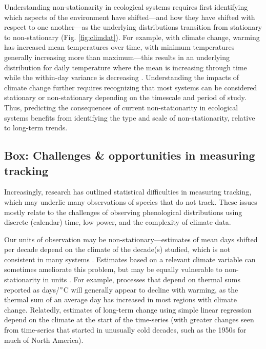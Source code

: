 \documentclass[11pt,letterpaper]{article}
\begin{document}
Understanding non-stationarity in ecological systems requires first identifying which aspects of the environment have shifted---and how they have shifted with respect to one another---as the underlying  distributions transition from stationary to non-stationary (Fig. \ref{fig:climdat}). For example, with climate change, warming has increased mean temperatures over time, with minimum temperatures generally increasing more than maximum---this results in an underlying distribution for daily temperature where the mean is increasing through time while the within-day variance is decreasing \citep{ipcc2013,screen2014}.  Understanding the impacts of climate change further requires recognizing that most systems can be considered stationary or non-stationary depending on the timescale and period of study. Thus, predicting the consequences of current non-stationarity in ecological systems benefits from identifying the type and scale of non-stationarity, relative to long-term trends.  



\subsection{Box: Challenges \& opportunities in measuring tracking} %
Increasingly, research has outlined statistical difficulties in measuring tracking, which may underlie many observations of species that do not track. These issues mostly relate to the challenges of observing phenological distributions \citep{steer2019,carter2018} using discrete (calendar) time, low power, and the complexity of climate data. 

Our units of observation may be non-stationary---estimates of mean days shifted per decade depend on the climate of the decade(s) studied, which is not consistent in many systems \citep{McCabe2012}. Estimates based on a relevant climate variable can sometimes ameliorate this problem, but may be equally vulnerable to non-stationarity in units \citep[e.g.,][]{Sagarin:2001fu}. For example, processes that depend on thermal sums reported as days/$\degree$C will generally appear to decline with warming, as the thermal sum of an average day has increased in most regions with climate change. Relatedly, estimates of long-term change using simple linear regression depend on the climate at the start of the time-series (with greater changes seen from time-series that started in unusually cold decades, such as the 1950s for much of North America). 
\end{document}
